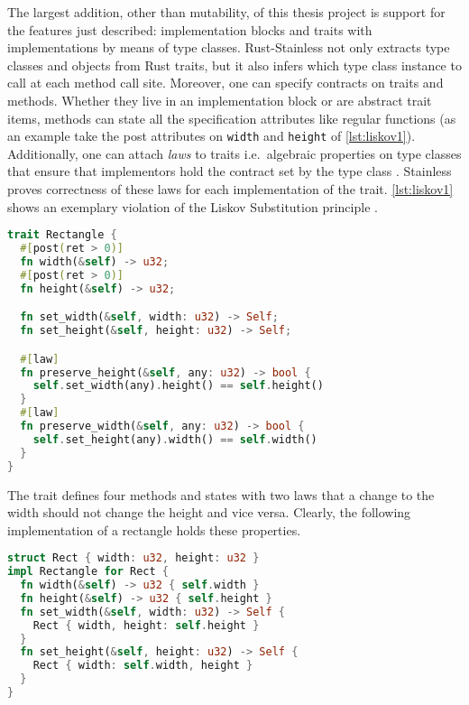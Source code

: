 The largest addition, other than mutability, of this thesis project is
support for the features just described: implementation blocks and
traits with implementations by means of type classes. Rust-Stainless not
only extracts type classes and objects from Rust traits, but it also
infers which type class instance to call at each method call site.
Moreover, one can specify contracts on traits and methods. Whether they
live in an implementation block or are abstract trait items, methods can
state all the specification attributes like regular functions (as an
example take the post attributes on \passthrough{\lstinline!width!} and
\passthrough{\lstinline!height!} of \autoref{lst:liskov1}).
Additionally, one can attach \emph{laws} to traits i.e.~algebraic
properties on type classes that ensure that implementors hold the
contract set by the type class \cite[section "Specifying Algebraic
Properties"]{stainless-doc}. Stainless proves correctness of these laws
for each implementation of the trait. \autoref{lst:liskov1} shows an
exemplary violation of the Liskov Substitution principle \cite{liskov}.

\begin{lstlisting}[language=Rust, caption={Example trait with laws.}, label={lst:liskov1}]
trait Rectangle {
  #[post(ret > 0)]
  fn width(&self) -> u32;
  #[post(ret > 0)]
  fn height(&self) -> u32;

  fn set_width(&self, width: u32) -> Self;
  fn set_height(&self, height: u32) -> Self;

  #[law]
  fn preserve_height(&self, any: u32) -> bool {
    self.set_width(any).height() == self.height()
  }
  #[law]
  fn preserve_width(&self, any: u32) -> bool {
    self.set_height(any).width() == self.width()
  }
}
\end{lstlisting}

The trait defines four methods and states with two laws that a change to
the width should not change the height and vice versa. Clearly, the
following implementation of a rectangle holds these properties.

\begin{lstlisting}[language=Rust, caption={Example implementation of the trait.}]
struct Rect { width: u32, height: u32 }
impl Rectangle for Rect {
  fn width(&self) -> u32 { self.width }
  fn height(&self) -> u32 { self.height }
  fn set_width(&self, width: u32) -> Self {
    Rect { width, height: self.height }
  }
  fn set_height(&self, height: u32) -> Self {
    Rect { width: self.width, height }
  }
}
\end{lstlisting}

